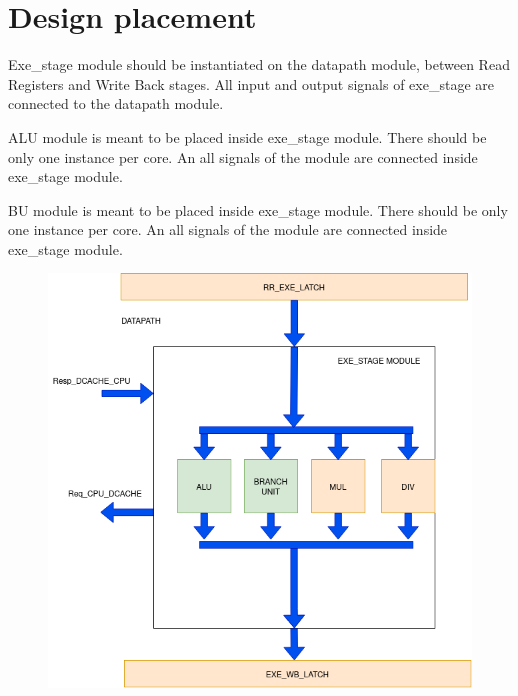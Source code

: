 \section{Design placement}
\label{chapter2}

Exe\_stage module should be instantiated on the datapath module, between Read Registers and Write Back stages. All input and output signals of exe\_stage are connected to the datapath module.

ALU module is meant to be placed inside exe\_stage module. There should be only one instance per core. An all signals of the module are connected inside exe\_stage module. 

BU module is meant to be placed inside exe\_stage module. There should be only one instance per core. An all signals of the module are connected inside exe\_stage module. 

\begin{figure}[H]
\centering
\includegraphics[width=0.85\linewidth]{schematic.png}
\end{figure}